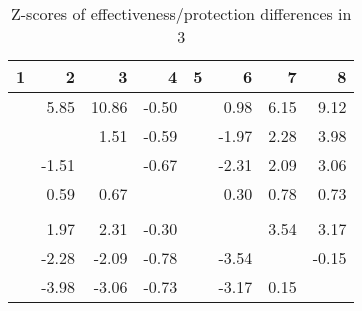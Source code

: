 \begin{table}[ht]
\centering
\begin{tabular}{rrrrrrrr}
  \hline
1 & 2 & 3 & 4 & 5 & 6 & 7 & 8 \\ 
  \hline
 & 5.85 & 10.86 & -0.50 &  & 0.98 & 6.15 & 9.12 \\ 
   &  & 1.51 & -0.59 &  & -1.97 & 2.28 & 3.98 \\ 
   & -1.51 &  & -0.67 &  & -2.31 & 2.09 & 3.06 \\ 
   & 0.59 & 0.67 &  &  & 0.30 & 0.78 & 0.73 \\ 
   &  &  &  &  &  &  &  \\ 
   & 1.97 & 2.31 & -0.30 &  &  & 3.54 & 3.17 \\ 
   & -2.28 & -2.09 & -0.78 &  & -3.54 &  & -0.15 \\ 
   & -3.98 & -3.06 & -0.73 &  & -3.17 & 0.15 &  \\ 
   \hline
\end{tabular}
\caption{Z-scores of effectiveness/protection differences in  3} 
\end{table}
